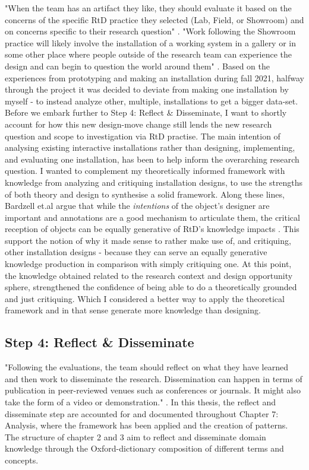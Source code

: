 "When the team has an artifact they like, they should evaluate it based on the concerns of the specific RtD practice they selected (Lab, Field, or Showroom) and on concerns specific to their research question" \autocite[p. 186]{zimmerman_research_2014}. "Work following the Showroom practice will likely involve the installation of a working system in a gallery or in some other place where people outside of the research team can experience the design and can begin to question the world around them" \autocite[p. 186]{zimmerman_research_2014}. Based on the experiences from prototyping and making an installation during fall 2021, halfway through the project it was decided to deviate from making one installation by myself - to instead analyze other, multiple, installations to get a bigger data-set. Before we embark further to Step 4: Reflect \& Disseminate, I want to shortly account for how this new design-move change still lends the new research question and scope to investigation via RtD practise. The main intention of analysing existing interactive installations rather than designing, implementing, and evaluating one installation, has been to help inform the overarching research question. I wanted to complement my theoretically informed framework with knowledge from analyzing and critiquing installation designs, to use the strengths of both theory and design to synthesise a solid framework. Along these lines, Bardzell et.al argue that while the \emph{intentions} of the object's designer are important and annotations are a good mechanism to articulate them, the critical reception of objects can be equally generative of RtD's knowledge impacts \autocite[p. 2093]{bardzell_immodest_2015}. This support the notion of why it made sense to rather make use of, and critiquing, other installation designs - because they can serve an equally generative knowledge production in comparison with simply critiquing one. At this point, the knowledge obtained related to the research context and design opportunity sphere, strengthened the confidence of being able to do a theoretically grounded and just critiquing. Which I considered a better way to apply the theoretical framework and in that sense generate more knowledge than designing.


\subsection{Step 4: Reflect \& Disseminate}
"Following the evaluations, the team should reflect on what they have learned and then work to disseminate the research. Dissemination can happen in terms of publication in peer-reviewed venues such as conferences or journals. It might also take the form of a video or demonstration." \autocite[p. 186]{zimmerman_research_2014}. In this thesis, the reflect and disseminate step are accounted for and documented throughout Chapter 7: Analysis, where the framework has been applied and the creation of patterns. The structure of chapter 2 and 3 aim to reflect and disseminate domain knowledge through the Oxford-dictionary composition of different terms and concepts. 


